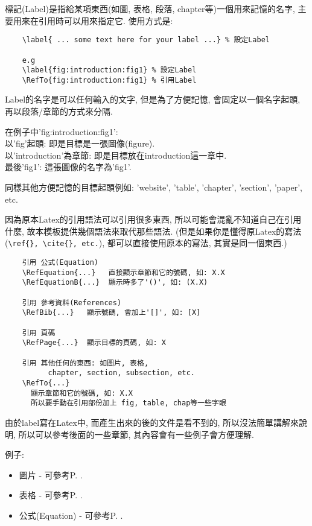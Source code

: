 \newpage
{}
標記(Label)是指給某項東西(如圖, 表格, 段落, chapter等)一個用來記憶的名字, 主要用來在引用時可以用來指定它. 使用方式是:

  \begin{framed}
  \begin{verbatim}
    \label{ ... some text here for your label ...} % 設定Label

    e.g
    \label{fig:introduction:fig1} % 設定Label
    \RefTo{fig:introduction:fig1} % 引用Label
  \end{verbatim}
  \end{framed}

Label的名字是可以任何輸入的文字, 但是為了方便記憶, 會固定以一個名字起頭, 再以段落/章節的方式來分隔.

\noindent 在例子中'fig:introduction:fig1':\\
以'fig'起頭: 即是目標是一張圖像(figure).\\
以'introduction'為章節: 即是目標放在introduction這一章中.\\
最後'fig1': 這張圖像的名字為'fig1'.

同樣其他方便記憶的目標起頭例如: 'website', 'table', 'chapter', 'section', 'paper', etc.

\newpage
{}
因為原本Latex的引用語法可以引用很多東西, 所以可能會混亂不知道自己在引用什麼, 故本模板提供幾個語法來取代那些語法. (但是如果你是懂得原Latex的寫法(\verb|\ref{}, \cite{}, etc.|), 都可以直接使用原本的寫法, 其實是同一個東西.)

  \begin{framed}
  \begin{verbatim}
    引用 公式(Equation)
    \RefEquation{...}   直接顯示章節和它的號碼, 如: X.X
    \RefEquationB{...}  顯示時多了'()', 如: (X.X)

    引用 參考資料(References)
    \RefBib{...}   顯示號碼, 會加上'[]', 如: [X]

    引用 頁碼
    \RefPage{...}  顯示目標的頁碼, 如: X

    引用 其他任何的東西: 如圖片, 表格,
          chapter, section, subsection, etc.
    \RefTo{...}
      顯示章節和它的號碼, 如: X.X
      所以要手動在引用部份加上 fig, table, chap等一些字眼
  \end{verbatim}
  \end{framed}

由於label寫在Latex中, 而產生出來的後的文件是看不到的, 所以沒法簡單講解來說明, 所以可以參考後面的一些章節, 其內容會有一些例子會方便理解.

例子:
\begin{itemize}
  \item 圖片 - 可參考P. .

  \item 表格 - 可參考P. .

  \item 公式(Equation) - 可參考P. .
\end{itemize}

